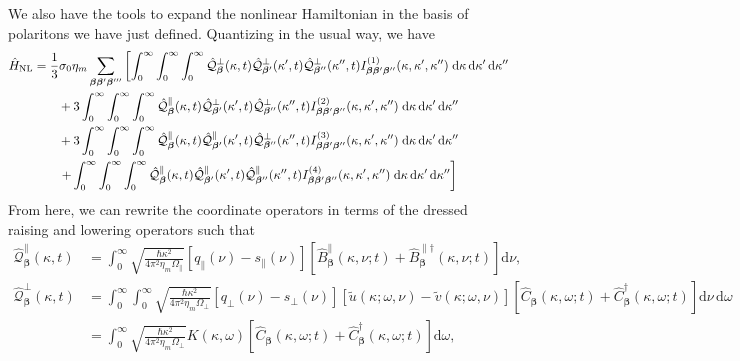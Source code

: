 \documentclass{article}
\begin{document}
We also have the tools to expand the nonlinear Hamiltonian in the basis of polaritons we have just defined. Quantizing in the usual way, we have
\begin{equation}
\begin{split}
\hat{H}_\mathrm{NL} &= \frac{1}{3}\sigma_0\eta_m\sum_{\bm{\beta}\bm{\beta}'\bm{\beta}'''}\left[\int_0^\infty\int_0^\infty\int_0^\infty\hat{\mathcal{Q}}_{\bm{\beta}}^\perp(\kappa,t)\hat{\mathcal{Q}}_{\bm{\beta}'}^\perp(\kappa',t)\hat{\mathcal{Q}}_{\bm{\beta}''}^\perp(\kappa'',t)I_{\bm{\beta}\bm{\beta}'\bm{\beta}''}^{(1)}(\kappa,\kappa',\kappa'')\;\mathrm{d}\kappa\,\mathrm{d}\kappa'\,\mathrm{d}\kappa''\right.\\
&\qquad + 3\int_0^\infty\int_0^\infty\int_0^\infty\hat{\mathcal{Q}}_{\bm{\beta}}^\parallel(\kappa,t)\hat{\mathcal{Q}}_{\bm{\beta}'}^\perp(\kappa',t)\hat{\mathcal{Q}}_{\bm{\beta}''}^\perp(\kappa'',t)I_{\bm{\beta}\bm{\beta}'\bm{\beta}''}^{(2)}(\kappa,\kappa',\kappa'')\;\mathrm{d}\kappa\,\mathrm{d}\kappa'\,\mathrm{d}\kappa''\\
&\qquad + 3\int_0^\infty\int_0^\infty\int_0^\infty\hat{\mathcal{Q}}_{\bm{\beta}}^\parallel(\kappa,t)\hat{\mathcal{Q}}_{\bm{\beta}'}^\parallel(\kappa',t)\hat{\mathcal{Q}}_{\bm{\beta}''}^\perp(\kappa'',t)I_{\bm{\beta}\bm{\beta}'\bm{\beta}''}^{(3)}(\kappa,\kappa',\kappa'')\;\mathrm{d}\kappa\,\mathrm{d}\kappa'\,\mathrm{d}\kappa''\\
&\qquad\left. + \int_0^\infty\int_0^\infty\int_0^\infty\hat{\mathcal{Q}}_{\bm{\beta}}^\parallel(\kappa,t)\hat{\mathcal{Q}}_{\bm{\beta}'}^\parallel(\kappa',t)\hat{\mathcal{Q}}_{\bm{\beta}''}^\parallel(\kappa'',t)I_{\bm{\beta}\bm{\beta}'\bm{\beta}''}^{(4)}(\kappa,\kappa',\kappa'')\;\mathrm{d}\kappa\,\mathrm{d}\kappa'\,\mathrm{d}\kappa'' \vphantom{\int_0^\infty} \right]
\end{split}
\end{equation}
From here, we can rewrite the coordinate operators in terms of the dressed raising and lowering operators such that
\begin{equation}
\begin{split}
\hat{\mathcal{Q}}_{\bm{\beta}}^\parallel(\kappa,t) &= \int_0^\infty\sqrt{\frac{\hbar\kappa^2}{4\pi^2\eta_m\Omega_\parallel}}[q_\parallel(\nu) - s_\parallel(\nu)]\left[\hat{B}_{\bm{\beta}}^\parallel(\kappa,\nu;t) + \hat{B}_{\bm{\beta}}^{\parallel\dagger}(\kappa,\nu;t)\right]\mathrm{d}\nu,\\
\hat{\mathcal{Q}}_{\bm{\beta}}^\perp(\kappa,t) &= \int_0^\infty\int_0^\infty\sqrt{\frac{\hbar\kappa^2}{4\pi^2\eta_m\Omega_\perp}}[q_\perp(\nu) - s_\perp(\nu)][\tilde{u}(\kappa;\omega,\nu) - \tilde{v}(\kappa;\omega,\nu)]\left[\hat{C}_{\bm{\beta}}(\kappa,\omega;t) + \hat{C}_{\bm{\beta}}^{\dagger}(\kappa,\omega;t)\right]\mathrm{d}\nu\,\mathrm{d}\omega\\
&= \int_0^\infty\sqrt{\frac{\hbar\kappa^2}{4\pi^2\eta_m\Omega_\perp}}K(\kappa,\omega)\left[\hat{C}_{\bm{\beta}}(\kappa,\omega;t) + \hat{C}_{\bm{\beta}}^{\dagger}(\kappa,\omega;t)\right]\mathrm{d}\omega,
\end{split}
\end{equation}
\end{document}
